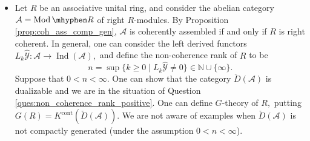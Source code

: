 \documentclass[11pt,leqno]{amsart}
\newtheorem{prop}[theo]{Proposition}
\numberwithin{equation}{section}
\def\N{\mathbb{N}}
\newcommand{\hy}{\mhyphen}
\newcommand{\Cat}{\operatorname{Cat}}
\newcommand{\cont}{\operatorname{cont}}
\newcommand{\St}{\operatorname{St}}
\newcommand{\st}{\operatorname{st}}
\newcommand{\dual}{\operatorname{dual}}
\newcommand{\cA}{{\mathcal A}}
\newcommand{\cE}{{\mathcal E}}
\newcommand{\cY}{{\mathcal Y}}
\newcommand{\Ab}{\operatorname{Ab}}
\newcommand{\add}{\operatorname{add}}
\newcommand{\Ind}{\operatorname{Ind}}
\newcommand{\Ac}{\operatorname{Ac}}
\newcommand{\Mod}{\operatorname{Mod}}
\begin{document}
\begin{itemize}
   	\item Let $R$ be an associative unital ring, and consider the abelian category $\cA=\Mod\hy R$ of right $R$-modules. By Proposition \ref{prop:coh_ass_comp_gen}, $\cA$ is coherently assembled if and only if $R$ is right coherent. In general, one can consider the left derived functors $L_k\hat{\cY}:\cA\to\Ind(\cA),$ and define the non-coherence rank of $R$ to be 
   	\begin{equation*}
   	n=\sup\{k\geq 0\mid L_k\hat{\cY}\ne 0\}\in\N\cup\{\infty\}.
   	\end{equation*}
   	Suppose that  $0<n<\infty.$ One can show that the category $\check{D}(\cA)$ is dualizable and we are in the situation of Question \ref{ques:non_coherence_rank_positive}. One can define $G$-theory of $R,$ putting $G(R)=K^{\cont}(\check{D}(\cA)).$ We are not aware of examples when $\check{D}(\cA)$ is not compactly generated (under the assumption $0<n<\infty$).
\end{itemize}


\end{document}
